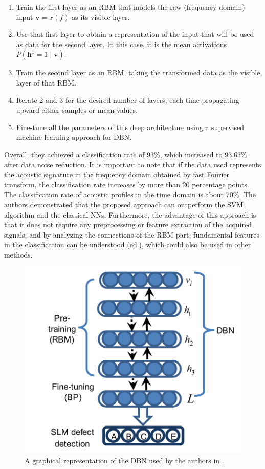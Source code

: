 \begin{enumerate}
\item Train the first layer as an RBM that models the raw (frequency domain) input $\mathbf{v}=x(f)$ as its visible layer. 
\item Use that first layer to obtain a representation of the input that will be used as data for the second layer. In this case, it is the mean activations $P(\mathbf{h}^1 =1\mid\mathbf{v})$.
\item Train the second layer as an RBM, taking the transformed data as the visible layer of that RBM. 
\item Iterate 2 and 3 for the desired number of layers, each time propagating upward either samples or mean values. 
\item Fine-tune all the parameters of this deep architecture using a supervised machine learning approach for DBN.
\end{enumerate}
Overall, they achieved a classification rate of 93\%, which increased to 93.63\% after data noise reduction. It is important to note that if the data used represents the acoustic signature in the frequency domain obtained by fast Fourier transform, the classification rate increases by more than 20 percentage points. The classification rate of acoustic profiles in the time domain is about 70\%. The authors demonstrated that the proposed approach can outperform the SVM algorithm and the classical NNs. Furthermore, the advantage of this approach is that it does not require any preprocessing or feature extraction of the acquired signals, and by analyzing the connections of the RBM part, fundamental features in the classification can be understood (ed.), which could also be used in other methods.

\begin{figure}
    \centering
    \includegraphics[scale=0.5]{Images/DBN paper.png}
    \caption[DBN used to detect HS.]{A graphical representation of the DBN used by the authors in \cite{ye_defect_2018}.}
    \label{fig:dbnhsgrafica}
\end{figure}



